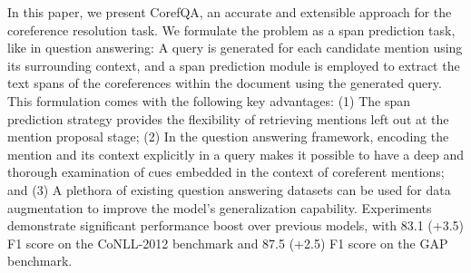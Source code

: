 In this paper, we present CorefQA, an accurate and extensible approach for the coreference resolution task. We formulate the problem as a span prediction task, like in question answering: A query is generated for each candidate mention using its surrounding context, and a span prediction module is employed to extract the text spans of the coreferences within the document using the generated query. This formulation comes with the following key advantages: (1) The span prediction strategy provides the flexibility of retrieving mentions left out at the mention proposal stage; (2) In the question answering framework, encoding the mention and its context explicitly in a query makes it possible to have a deep and thorough examination of cues embedded in the context of coreferent mentions; and (3) A plethora of existing question answering datasets can be used for data augmentation to improve the model's generalization capability. Experiments demonstrate significant performance boost over previous models, with 83.1 (+3.5) F1 score on the CoNLL-2012 benchmark and 87.5 (+2.5) F1 score on the GAP benchmark.
